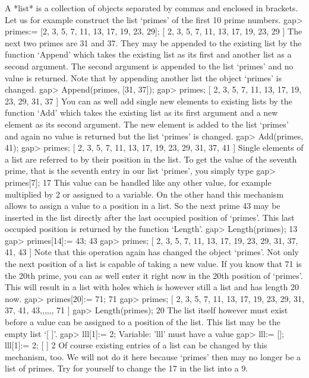 %
A *list* is a collection of objects separated by  commas and enclosed  in
brackets.  Let us for example construct the list `primes' of the first 10
prime numbers.
\beginexample
    gap> primes:= [2, 3, 5, 7, 11, 13, 17, 19, 23, 29];
    [ 2, 3, 5, 7, 11, 13, 17, 19, 23, 29 ]
\endexample
The next two primes are  31 and 37.  They may be appended to the existing
list by the function `Append' which takes  the existing list as its first
and another list as a second argument.  The  second argument  is appended
to the list `primes' and  no  value is returned.  Note that  by appending
another list the object `primes' is changed.
\beginexample
    gap> Append(primes, [31, 37]);
    gap> primes;
    [ 2, 3, 5, 7, 11, 13, 17, 19, 23, 29, 31, 37 ] 
\endexample
You can as well add single new elements to existing lists by the function
`Add'  which takes  the existing list  as its  first argument  and  a new
element as  its second argument.  The  new  element  is added to the list
`primes' and again no value is returned but the list `primes' is changed.
\beginexample
    gap> Add(primes, 41);
    gap> primes;
    [ 2, 3, 5, 7, 11, 13, 17, 19, 23, 29, 31, 37, 41 ] 
\endexample
Single elements of a list are referred to by their position in the  list.
To get the value  of the seventh prime, that is the seventh entry in  our
list `primes', you simply type
\beginexample
    gap> primes[7];
    17 
\endexample
This value can be handled like any other value, for example multiplied by
2 or assigned to a  variable. On the other hand  this mechanism allows to
assign a value to  a position in  a  list. So the   next prime 43  may be
inserted  in the   list directly  after the  last   occupied position  of
`primes'. This  last occupied    position  is returned  by  the  function
`Length'.
\beginexample
    gap> Length(primes);
    13
    gap> primes[14]:= 43;
    43
    gap> primes;
    [ 2, 3, 5, 7, 11, 13, 17, 19, 23, 29, 31, 37, 41, 43 ] 
\endexample
Note that this operation again has changed the object `primes'.  Not only
the next position of a list is capable  of taking  a  new  value.  If you
know that 71 is the 20th prime, you can as well enter it right now in the
20th position of `primes'.   This  will result in a list with holes which
is however still a list and has length 20 now.
\beginexample
    gap> primes[20]:= 71;
    71
    gap> primes;
    [ 2, 3, 5, 7, 11, 13, 17, 19, 23, 29, 31, 37, 41, 43,,,,,, 71 ]
    gap> Length(primes);
    20 
\endexample
The list itself however must  exist before a  value can be  assigned to a
position of the list.  This list may be the empty list `[ ]'.
\beginexample
    gap> lll[1]:= 2;
    Variable: 'lll' must have a value
    gap> lll:= []; lll[1]:= 2;
    [  ]
    2 
\endexample
Of course  existing entries of a list  can be  changed by this mechanism,
too. We will not do it here because `primes' then may no longer be a list
of primes. Try for yourself to change the 17 in the list into a 9.

